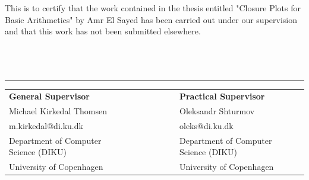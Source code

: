 \documentclass[11pt]{article}
\begin{document}
This is to certify that the work contained in the thesis entitled "Closure Plots for Basic Arithmetics" by Amr El Sayed has been carried out under our supervision and that this work has not been submitted elsewhere.\\\\\\\\
\begin{center}\noindent\rule{8cm}{0.4pt}%

\begin{tabular}{ l l l c r l l l}\\
    \textbf{General Supervisor} & & & & & & \textbf{Practical Supervisor} \\
    Michael Kirkedal Thomsen & & & & & & Oleksandr Shturmov\\
    m.kirkedal@di.ku.dk & & & & & & oleks@di.ku.dk\\
    Department of Computer Science (DIKU) & & & & & & Department of Computer Science (DIKU)\\
    University of Copenhagen & & & & & & University of Copenhagen\\
\end{tabular}
\end{center}
\end{document}
